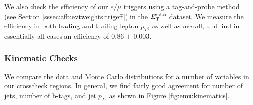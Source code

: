 We also check the efficiency of our $e/\mu$ triggers using a
tag-and-probe method (see Section \ref{sssec:afb:evtweights:trigeff})
in the $E_\text{T}^\text{miss}$ dataset. We measure the efficiency in both leading and
trailing lepton $p_T$, as well as overall, and find in essentially all
cases an efficiency of 0.86 $\pm$ 0.003.

\subsubsection{Kinematic Checks}
\label{sssec:emu:kinematics}

We compare the data and Monte Carlo distributions for a number of
variables in our crosscheck regions. In general, we find fairly good
agreement for number of jets, number of b-tags, and jet $p_T$, as
shown in Figure \ref{fig:emu:kinematics}.

